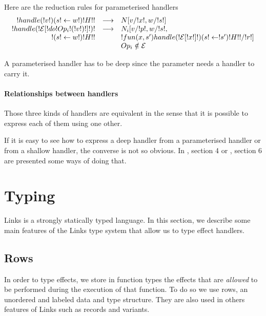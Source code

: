 \documentclass[11pt, nonacm=true, language=french, language=english]{acmart}
\begin{document}
Here are the reduction rules for parameterised handlers
\[
  \begin{array}{rcll}
    !handle ( !v! ) ( s!\leftarrow w! ) { !H! }! & \longrightarrow & N[v/!x!, w/!s!] \\
    !handle ( !\mathcal E[!do !Op_{i}!( !v! )!]! ) !  & \longrightarrow & N_{i}[v/!p!, w/!s!, \\
    ! ( s!\leftarrow w! ) { !H! }!                        &                 & !fun (x, s')  { handle ( !\mathcal E[!x!] ! ) ( s!\leftarrow!s' ) { !H! } }!/!r!] \\
                                                     &                 & Op_{i} \notin \mathcal E\\
  \end{array}
\]

\begin{rem}
  A parameterised handler has to be deep since the parameter needs a handler to carry it.
\end{rem}

\paragraph{Relationships between handlers}

Those three kinds of handlers are equivalent in the sense that it is possible to express each of them using one other.

If it is easy to see how to express a deep handler from a parameterised handler or from a shallow handler, the converse is not so obvious. In \citep{ehgc}, section 4 or \citep{daniel-thesis}, section 6 are presented some ways of doing that.

\section{Typing}
\label{sec:typing}

Links is a strongly statically typed language. In this section, we describe some main features of the Links type system that allow us to type effect handlers.

\subsection{Rows}
\label{sec:row-typ}

In order to type effects, we store in function types the effects that are \emph{allowed} to be performed during the execution of that function. To do so we use rows, an unordered and labeled data and type structure. They are also used in others features of Links such as records and variants.
\end{document}
